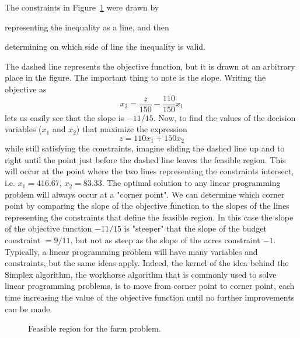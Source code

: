 The constraints in Figure~\ref{fig:feasibleregion} were drawn by 
\begin{inparaenum}[1)]
\item representing the inequality as a line, and then 
\item determining on which side of line the inequality is valid. 
\end{inparaenum}
The dashed line represents the objective function, but it is drawn at an
arbitrary place in the figure. The important thing to note is the
slope. Writing the objective as
\[ x_2 = \frac{z}{150} - \frac{110}{150}x_1 \]
lets us easily see that the slope is $-11/15$. Now, to find the
values of the decision variables ($x_1$ and $x_2$) that maximize
the expression
\[ z = 110x_1 + 150x_2 \]
while still satisfying the constraints, imagine sliding the dashed line
up and to right until the point just before the dashed line leaves the
feasible region. This will occur at the point where the two 
lines representing the constraints intersect, i.e. $x_1 = 416.67$, $x_2 = 83.33$.
The optimal solution to any linear programming problem will always
occur at a "corner point". We can determine which corner point by comparing
the slope of the objective function to the slopes of the lines representing the
constraints that define the feasible region. In this case the slope of the objective
function $-11/15$ is "steeper" that the slope of the budget constraint $=9/11$, but
not as steep as the slope of the acres constraint $-1$. Typically, a
linear programming problem will have many variables and constraints, but the same
ideas apply. Indeed, the kernel of the idea behind the Simplex algorithm,
the workhorse algorithm that is commonly used to solve linear programming problems, 
is to move from corner
point to corner point, each time increasing the value of the objective
function until no further improvements can be made.

\begin{figure}
\begin{center}
\end{center}
\caption{Feasible region for the farm problem.}
\label{fig:feasibleregion}
\end{figure}

